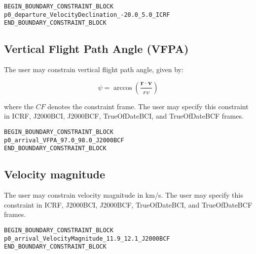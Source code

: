 \documentclass[11pt]{article}
\begin{document}
\begin{verbatim}
BEGIN_BOUNDARY_CONSTRAINT_BLOCK
p0_departure_VelocityDeclination_-20.0_5.0_ICRF
END_BOUNDARY_CONSTRAINT_BLOCK
\end{verbatim}

\subsection{Vertical Flight Path Angle (VFPA)}
\label{subsec:velocity_vertical_flight_path_angle}
The user may constrain vertical flight path angle, given by:

\begin{equation}
\psi = \arccos \left(\frac{\mathbf{r} \cdot \mathbf{v} }{rv}\right)
\end{equation}

\noindent where the $CF$ denotes the constraint frame. The user may specify this constraint in ICRF, J2000BCI, J2000BCF, TrueOfDateBCI, and TrueOfDateBCF frames.

\begin{verbatim}
BEGIN_BOUNDARY_CONSTRAINT_BLOCK
p0_arrival_VFPA_97.0_98.0_J2000BCF
END_BOUNDARY_CONSTRAINT_BLOCK
\end{verbatim}

\subsection{Velocity magnitude}
\label{subsec:velocity_magnitude}
The user may constrain velocity magnitude in km/s. The user may specify this constraint in ICRF, J2000BCI, J2000BCF, TrueOfDateBCI, and TrueOfDateBCF frames.

\begin{verbatim}
BEGIN_BOUNDARY_CONSTRAINT_BLOCK
p0_arrival_VelocityMagnitude_11.9_12.1_J2000BCF
END_BOUNDARY_CONSTRAINT_BLOCK
\end{verbatim}
\end{document}
